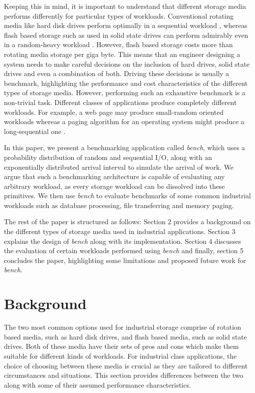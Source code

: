 \documentclass[10pt, author, twocolumn]{article}
\begin{document}
Keeping this in mind, it is important to understand that different storage media performs differently for particular types of workloads. Conventional rotating media like hard disk drives perform optimally in a sequential workload \cite{}, whereas flash based storage such as used in solid state drives can perform admirably even in a random-heavy workload \cite{}. However, flash based storage costs more than rotating media storage per giga byte. This means that an engineer designing a system needs to make careful decisions on the inclusion of hard drives, solid state drives and even a combination of both. Driving these decisions is usually a benchmark, highlighting the performance and cost characteristics of the different types of storage media. However, performing such an exhaustive benchmark is a non-trivial task. Different classes of applications produce completely different workloads. For example, a web page may produce small-random oriented workloads whereas a paging algorithm for an operating system might produce a long-sequential one \cite{}.

In this paper, we present a benchmarking application called \textit{bench}, which uses a probability distribution of random and sequential I/O, along with an exponentially distributed arrival interval to simulate the arrival of work. We argue that such a benchmarking architecture is capable of evaluating any arbitrary workload, as every storage workload can be dissolved into these primitives. We then use \textit{bench} to evaluate benchmarks of some common industrial workloads such as database processing, file transferring and memory paging. 

The rest of the paper is structured as follows: Section 2 provides a background on the different types of storage media used in industrial applications. Section 3 explains the design of \textit{bench} along with its implementation. Section 4 discusses the evaluation of certain workloads performed using \textit{bench} and finally, section 5 concludes the paper, highlighting some limitations and proposed future work for \textit{bench}.

\section{Background}

The two most common options used for industrial storage comprise of rotation based media, such as hard disk drives, and flash based media, such as solid state drives. Both of these media have their sets of pros and cons which make them suitable for different kinds of workloads. For industrial class applications, the choice of choosing between these media is crucial as they are tailored to different circumstances and situations. This section provides differences between the two along with some of their assumed performance characteristics. 
\end{document}
